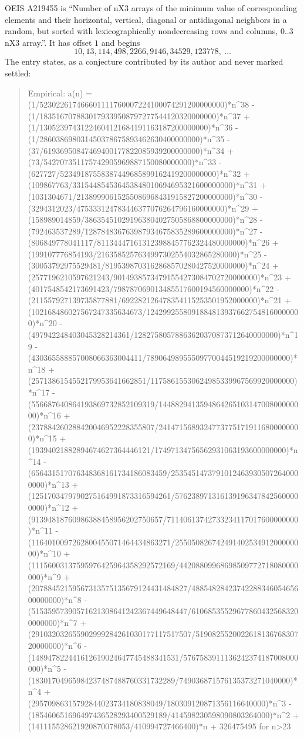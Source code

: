 \documentclass[11pt,a4paper]{article}
\theoremstyle{plain}
\theoremstyle{definition}
\begin{document}
OEIS A219455 is ``Number of nX3 arrays of the minimum value of corresponding elements and their horizontal, vertical, diagonal or antidiagonal neighbors in a random, but sorted with lexicographically nondecreasing rows and columns, 0..3 nX3 array.''. It has offset $1$ and begins
\[
10, 13, 114, 498, 2266, 9146, 34529, 123778,\ \dots
\]
The entry states, as a conjecture contributed by its author and never marked settled:
\begin{quote}\raggedright\small
Empirical: a(n) = (1/523022617466601111760007224100074291200000000)*n\^{}38 - (1/1835167078830179339508797277544120320000000)*n\^{}37 + (1/13052397431224604121684191163187200000000)*n\^{}36 - (1/286038698031450378675893462630400000000)*n\^{}35 - (37/61936950847469400177822085939200000000)*n\^{}34 + (73/542707351175742905969887150080000000)*n\^{}33 - (627727/52349187558387449685899162419200000000)*n\^{}32 + (109867763/331544854536453848010694695321600000000)*n\^{}31 + (1031304671/21389990615255086968431915827200000000)*n\^{}30 - (3294312023/475333124783446377076264796160000000)*n\^{}29 + (158989014859/386354510291963804027505868800000000)*n\^{}28 - (792463537289/128784836763987934675835289600000000)*n\^{}27 - (806849778041117/811344471613123988457762324480000000)*n\^{}26 + (199107776854193/2163585257634997302554032865280000)*n\^{}25 - (30053792975529481/8195398703162868570280427520000000)*n\^{}24 + (2577196210597621243/90149385734791554273084702720000000)*n\^{}23 + (4017548542173691423/798787069013485517600194560000000)*n\^{}22 - (211557927139735877881/692282126478354115253501952000000)*n\^{}21 + (102168486027567247335634673/12429925580918848139376627548160000000)*n\^{}20 - (497942248403045328214361/12827580578863620370873712640000000)*n\^{}19 - (430365588857008066363004411/78906498955509770044519219200000000)*n\^{}18 + (2571386154552179953641662851/11758615530624985339967569920000000)*n\^{}17 - (556687640864193869732852109319/144882941359486426510314700800000000)*n\^{}16 + (237884260288420046952228355807/24147156893247737751719116800000000)*n\^{}15 + (19394021882894674627364446121/17497134756562931063193600000000)*n\^{}14 - (656431517076348368161734186083459/25354514737910124639305072640000000)*n\^{}13 + (1251703479790275164991873316594261/5762389713161391963478425600000000)*n\^{}12 + (91394818760986388458956202750657/71140613742733234117017600000000)*n\^{}11 - (1164010097262800455071464434863271/25505082674249140253491200000000)*n\^{}10 + (11156003137595976425964358292572169/44208809968698509772718080000000)*n\^{}9 + (20788452159567313575135679124431484827/4885482842374228834605465600000000)*n\^{}8 - (51535957390571621308641242367449648447/610685355296778604325683200000000)*n\^{}7 + (291032032655902999284261030177117517507/519082552002261813676830720000000)*n\^{}6 - (148947822441612619024647745488341531/5767583911136242374187008000000)*n\^{}5 - (18301704965984237487488760331732289/749036871576135373271040000)*n\^{}4 + (29570986315792844023734180838049/180309120871356116640000)*n\^{}3 - (185460651696497436528293400529189/414598230598090803264000)*n\^{}2 + (141115528621920870078053/410994727466400)*n + 326475495 for n>23
\end{quote}
\end{document}
